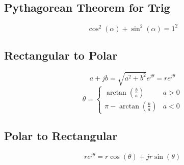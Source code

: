 	\subsection{Pythagorean Theorem for Trig} \label{subsec:Pythagorean Theorem for Trig}
		\begin{equation} \label{eq:Pythagorean Theorem for Trig}
			\cos^{2} \left( \alpha \right) + \sin^{2} \left( \alpha \right) = 1^{2}
		\end{equation}
		
	\subsection{Rectangular to Polar} \label{subsec:Rectangular to Polar}
		\begin{equation} \label{eq:Rectangular to Polar-Magnitude}
			a + j b = \sqrt{a^{2}+b^{2}} e^{j \theta} = re^{j \theta}
		\end{equation}
		\begin{equation} \label{eq:Rectangular to Polar-Angle}
			\theta = \begin{cases}
				\arctan \left( \frac{b}{a} \right) & a>0 \\
				\pi - \arctan \left( \frac{b}{a} \right) & a<0
			\end{cases}
		\end{equation}
		
	\subsection{Polar to Rectangular} \label{subsec:Polar to Rectangular}
		\begin{equation} \label{eq:Polar to Rectangular}
			re^{j \theta} = r \cos \left( \theta \right) + j r \sin \left( \theta \right)
		\end{equation}